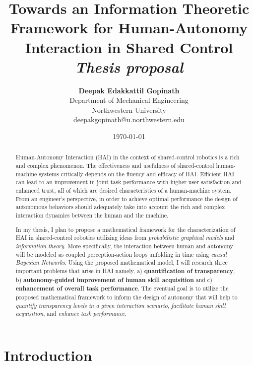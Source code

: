 \documentclass[12pt]{article}
\title{{\bf Towards an Information Theoretic Framework for Human-Autonomy Interaction in Shared Control} \\
\it Thesis proposal}
\author{ {\bf Deepak Edakkattil Gopinath}  \\
Department of Mechanical Engineering \\
Northwestern University\\
{\small deepakgopinath@u.northwestern.edu}
}
\date{\today}
\begin{document}
\pagestyle{plain}
\maketitle

\pagebreak
\begin{abstract}
Human-Autonomy Interaction (HAI) in the context of shared-control robotics is a rich and complex phenomenon. The effectiveness and usefulness of shared-control human-machine systems critically depends on the fluency and efficacy of HAI. Efficient HAI can lead to an improvement in joint task performance with higher user satisfaction and enhanced trust, all of which are desired characteristics of a human-machine system. From an engineer's perspective, in order to achieve optimal performance the design of autonomous behaviors should adequately take into account the rich and complex interaction dynamics between the human and the machine.

In my thesis, I plan to propose a mathematical framework for the characterization of HAI in shared-control robotics utilizing ideas from \textit{probabilistic graphical models} and \textit{information theory}. More specifically, the interaction between human and autonomy will be modeled as coupled perception-action loops unfolding in time using \textit{causal Bayesian Networks}.  Using the proposed mathematical model, I will research three important problems that arise in HAI namely, a) \textbf{quantification of transparency}, b) \textbf{autonomy-guided improvement of human skill acquisition} and c) \textbf{enhancement of overall task performance}. The eventual goal is to utilize the proposed mathematical framework to inform the design of autonomy that will help to \textit{quantify transparency levels in a given interaction scenario}, \textit{facilitate human skill acquisition}, and \textit{enhance task performance}.
\end{abstract}

\pagebreak
\tableofcontents
\pagebreak

\cleardoublepage
{}

\section{Introduction}
\label{sec:intro}
\end{document}
